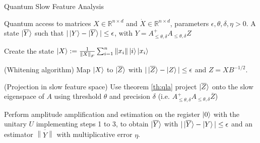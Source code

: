 \documentclass{article}
\newcommand{\norm}[1]{\left\lVert#1\right\rVert}
\begin{document}
\pagestyle{empty}

 \begin{algorithm}[ht]
 \label{alg_QSFA}
 \caption{Quantum Slow Feature Analysis}
 \begin{algorithmic}[1]
 \Require
       \Statex Quantum access to matrices $X \in \mathbb{R}^{n \times d}$ and $\dot{X} \in \mathbb{R}^{n \times d}$, parameters $\epsilon, \theta,\delta,\eta >0$.
     \Ensure
       \Statex A state $\ket{\overline{Y}}$ such that $ | \ket{Y} - \ket{\overline{Y}} | \leq \epsilon$, with $Y = A^+_{\leq \theta, \delta}A_{\leq \theta, \delta} Z$
       \Statex

 \State Create the state $\ket{X} :=  \frac{1}{\norm{X}_F} \sum_{i=1}^{n} \norm{x_i} \ket{i}\ket{x_i} $

 \State (Whitening algorithm) Map $\ket{X}$ to $\ket{\overline{Z}}$ with $| \ket{\overline{Z}}  - \ket{Z} | \leq \epsilon $ and $Z=XB^{-1/2}.$

 \State (Projection in slow feature space) Use theorem \ref{th:qla} project $\ket{\overline{Z}}$ onto the slow eigenspace of $A$ using threshold $\theta$ and precision $\delta$ (i.e. $A^+_{\leq \theta, \delta}A_{\leq \theta, \delta}\overline{Z}$)

 \State Perform amplitude amplification and estimation on the register $\ket{0}$ with the unitary $U$ implementing steps 1 to 3, to obtain
 $\ket{\overline{Y}}$ with $| \ket{\overline{Y}} - \ket{Y}  | \leq \epsilon $ and an estimator $\overline{\norm{Y}}$  with multiplicative error $\eta$.
 \end{algorithmic}
 \end{algorithm}
\end{document}
